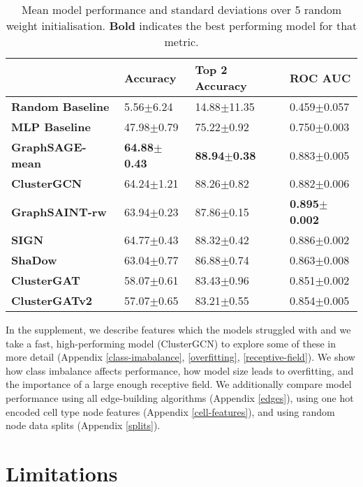 \documentclass{article}
\begin{document}
\begin{table}
  \caption{Mean model performance and standard deviations over 5 random weight initialisation. \textbf{Bold} indicates the best performing model for that metric.}
  \label{model-results}
  \centering
  \begin{tabular}{llll}
    \toprule
    & \textbf{Accuracy} & \textbf{Top 2 Accuracy} & \textbf{ROC AUC} \\
    \midrule
    \textbf{Random Baseline} &  5.56$\pm$6.24 & 14.88$\pm$11.35 & 0.459$\pm$0.057 \\
    \textbf{MLP Baseline} &     47.98$\pm$0.79 & 75.22$\pm$0.92 & 0.750$\pm$0.003 \\
    \textbf{GraphSAGE-mean} &   \textbf{64.88$\pm$0.43} & \textbf{88.94$\pm$0.38} & 0.883$\pm$0.005 \\
    \textbf{ClusterGCN} &       64.24$\pm$1.21 & 88.26$\pm$0.82 & 0.882$\pm$0.006 \\
    \textbf{GraphSAINT-rw} &    63.94$\pm$0.23 & 87.86$\pm$0.15 & \textbf{0.895$\pm$0.002} \\
    \textbf{SIGN} &             64.77$\pm$0.43 & 88.32$\pm$0.42 & 0.886$\pm$0.002 \\
    \textbf{ShaDow} &           63.04$\pm$0.77 & 86.88$\pm$0.74 & 0.863$\pm$0.008 \\
    \textbf{ClusterGAT} &       58.07$\pm$0.61 & 83.43$\pm$0.96 & 0.851$\pm$0.002 \\
    \textbf{ClusterGATv2} &     57.07$\pm$0.65 & 83.21$\pm$0.55 & 0.854$\pm$0.005\\
    \bottomrule
  \end{tabular}
\end{table}

In the supplement, we describe features which the models struggled with and we take a fast, high-performing model (ClusterGCN) to explore some of these in more detail (Appendix \ref{class-imabalance}, \ref{overfitting}, \ref{receptive-field}). We show how class imbalance affects performance, how model size leads to overfitting, and the importance of a large enough receptive field. We additionally compare model performance using all edge-building algorithms (Appendix \ref{edges}), using one hot encoded cell type node features (Appendix \ref{cell-features}), and using random node data splits (Appendix \ref{splits}).

\section{Limitations}
\label{limitations}
\end{document}
